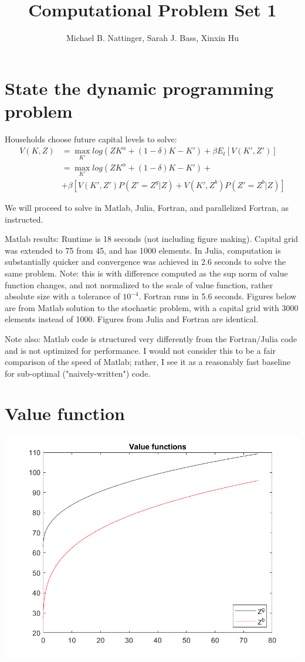 \documentclass[11pt]{article} %
\title{Computational Problem Set 1}
\author{Michael B. Nattinger, Sarah J. Bass, Xinxin Hu}
\begin{document}
\maketitle

\section{State the dynamic programming problem}
Households choose future capital levels to solve:
\begin{align*}
V(K,Z) &= \max_{K'} log(ZK^{\alpha} + (1-\delta)K - K') + \beta E_t[V(K',Z')]\\
&=  \max_{K'} log(ZK^{\alpha} + (1-\delta)K - K') + \\ &+ \beta[V(K',Z')P(Z' = Z^g|Z) + V(K',Z^b)P(Z' = Z^b|Z)]
\end{align*}

We will proceed to solve in Matlab, Julia, Fortran, and parallelized Fortran, as instructed.

Matlab results: Runtime is 18 seconds (not including figure making). Capital grid was extended to 75 from 45, and has 1000 elements. In Julia, computation is substantially quicker and convergence was achieved in 2.6 seconds to solve the same problem. Note: this is with difference computed as the sup norm of value function changes, and not normalized to the scale of value function, rather absolute size with a tolerance of $10^{-4}$. Fortran runs in 5.6 seconds. Figures below are from Matlab solution to the stochastic problem, with a capital grid with 3000 elements instead of 1000. Figures from Julia and Fortran are identical.

Note also: Matlab code is structured very differently from the Fortran/Julia code and is not optimized for performance. I would not consider  this to be a fair comparison of the speed of Matlab; rather,  I see it as a reasonably fast baseline for sub-optimal ("naively-written") code.

\section{Value function}
\includegraphics{value}
\end{document}

